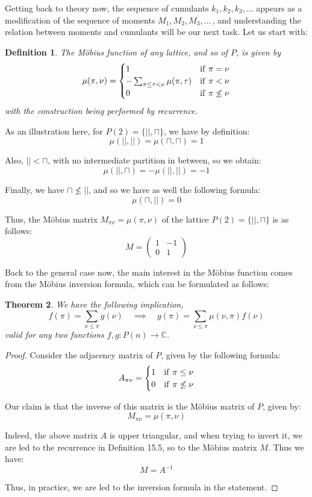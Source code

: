 \documentclass[12pt]{amsbook}
\newtheorem{theorem}{Theorem}[chapter]
\newtheorem{definition}[theorem]{Definition}
\begin{document}
Getting back to theory now, the sequence of cumulants $k_1,k_2,k_3,\ldots$ appears as a modification of the sequence of moments $M_1,M_2,M_3,\ldots\,$, and understanding the relation between moments and cumulants will be our next task. Let us start with:


\begin{definition}
The M\"obius function of any lattice, and so of $P$, is given by
$$\mu(\pi,\nu)=\begin{cases}
1&{\rm if}\ \pi=\nu\\
-\sum_{\pi\leq\tau<\nu}\mu(\pi,\tau)&{\rm if}\ \pi<\nu\\
0&{\rm if}\ \pi\not\leq\nu
\end{cases}$$
with the construction being performed by recurrence.
\end{definition}

As an illustration here, for $P(2)=\{||,\sqcap\}$, we have by definition:
$$\mu(||,||)=\mu(\sqcap,\sqcap)=1$$

Also, $||<\sqcap$, with no intermediate partition in between, so we obtain:
$$\mu(||,\sqcap)=-\mu(||,||)=-1$$

Finally, we have $\sqcap\not\leq||$, and so we have as well the following formula:
$$\mu(\sqcap,||)=0$$

Thus, the M\"obius matrix $M_{\pi\nu}=\mu(\pi,\nu)$ of the lattice $P(2)=\{||,\sqcap\}$ is as follows:
$$M=\begin{pmatrix}1&-1\\ 0&1\end{pmatrix}$$

Back to the general case now, the main interest in the M\"obius function comes from the M\"obius inversion formula, which can be formulated as follows:


\begin{theorem}
We have the following implication,
$$f(\pi)=\sum_{\nu\leq\pi}g(\nu)
\quad\implies\quad
g(\pi)=\sum_{\nu\leq\pi}\mu(\nu,\pi)f(\nu)$$
valid for any two functions $f,g:P(n)\to\mathbb C$.
\end{theorem}

\begin{proof}
Consider the adjacency matrix of $P$, given by the following formula:
$$A_{\pi\nu}=\begin{cases}
1&{\rm if}\ \pi\leq\nu\\
0&{\rm if}\ \pi\not\leq\nu
\end{cases}$$

Our claim is that the inverse of this matrix is the M\"obius matrix of $P$, given by:
$$M_{\pi\nu}=\mu(\pi,\nu)$$

Indeed, the above matrix $A$ is upper triangular, and when trying to invert it, we are led to the recurrence in Definition 15.5, so to the M\"obius matrix $M$. Thus we have:
$$M=A^{-1}$$

Thus, in practice, we are led to the inversion formula in the statement.
\end{proof}
\end{document}
